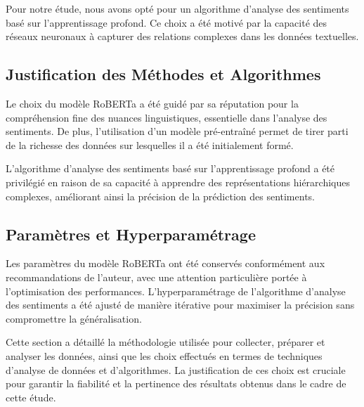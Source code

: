 Pour notre étude, nous avons opté pour un algorithme d'analyse des sentiments basé sur l'apprentissage profond. Ce choix a été motivé par la capacité des réseaux neuronaux à capturer des relations complexes dans les données textuelles.

\subsection{Justification des Méthodes et Algorithmes}

Le choix du modèle RoBERTa a été guidé par sa réputation pour la compréhension fine des nuances linguistiques, essentielle dans l'analyse des sentiments. De plus, l'utilisation d'un modèle pré-entraîné permet de tirer parti de la richesse des données sur lesquelles il a été initialement formé.

L'algorithme d'analyse des sentiments basé sur l'apprentissage profond a été privilégié en raison de sa capacité à apprendre des représentations hiérarchiques complexes, améliorant ainsi la précision de la prédiction des sentiments.

\subsection{Paramètres et Hyperparamétrage}

Les paramètres du modèle RoBERTa ont été conservés conformément aux recommandations de l'auteur, avec une attention particulière portée à l'optimisation des performances. L'hyperparamétrage de l'algorithme d'analyse des sentiments a été ajusté de manière itérative pour maximiser la précision sans compromettre la généralisation.

Cette section a détaillé la méthodologie utilisée pour collecter, préparer et analyser les données, ainsi que les choix effectués en termes de techniques d'analyse de données et d'algorithmes. La justification de ces choix est cruciale pour garantir la fiabilité et la pertinence des résultats obtenus dans le cadre de cette étude.

